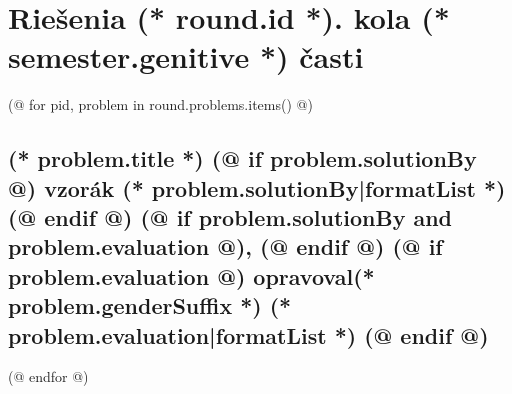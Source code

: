 \documentclass[12pt, twoside]{article}
\newcounter{volume}
\newcounter{semester}
\newcounter{round}
\newcounter{problem}
\begin{document}
            
    \pagestyle{problems-(* competition.id *)-(* volume.id *)-(* semester.id *)-(* round.id *)}
    \thispagestyle{first-(* competition.id *)-(* volume.id *)-(* semester.id *)}
    \vspace*{8mm}
   
    \section{\texorpdfstring{Riešenia (* round.id *). kola (* semester.genitive *) časti}{Riešenia}}
        
    (@ for pid, problem in round.problems.items() @)%
    \setcounter{volume}{(* volume.number *)}%
    \setcounter{semester}{(* semester.number *)}%
    \setcounter{round}{(* round.number *)}%
    \setcounter{problem}{(* problem.number *)}%

    \subsection{%
        \texorpdfstring{%
            \large \textbf{(* problem.title *)} \hfill \normalsize%
            (@ if problem.solutionBy @)%
                vzorák (* problem.solutionBy|formatList *)%
            (@ endif @)%
            (@ if problem.solutionBy and problem.evaluation @), (@ endif @)%
            (@ if problem.evaluation @)%
                opravoval(* problem.genderSuffix *) (* problem.evaluation|formatList *)%
            (@ endif @)%
        }{(* problem.title *)}%
    }
    (@ endfor @)
\end{document}
